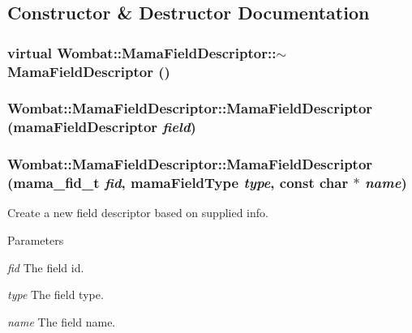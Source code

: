 \subsection{Constructor \& Destructor Documentation}
\hypertarget{classWombat_1_1MamaFieldDescriptor_a4cdfb03e5132217d4eda78ba12ab48e8}{
\subsubsection[{$\sim$MamaFieldDescriptor}]{\setlength{\rightskip}{0pt plus 5cm}virtual Wombat::MamaFieldDescriptor::$\sim$MamaFieldDescriptor ()}}
\label{classWombat_1_1MamaFieldDescriptor_a4cdfb03e5132217d4eda78ba12ab48e8}
\hypertarget{classWombat_1_1MamaFieldDescriptor_a3de9bbef1117efb9a923eb9e71381958}{
\subsubsection[{MamaFieldDescriptor}]{\setlength{\rightskip}{0pt plus 5cm}Wombat::MamaFieldDescriptor::MamaFieldDescriptor (mamaFieldDescriptor {\em field})}}
\label{classWombat_1_1MamaFieldDescriptor_a3de9bbef1117efb9a923eb9e71381958}
\hypertarget{classWombat_1_1MamaFieldDescriptor_a05360c572e90e2b40948888678659ab7}{
\subsubsection[{MamaFieldDescriptor}]{\setlength{\rightskip}{0pt plus 5cm}Wombat::MamaFieldDescriptor::MamaFieldDescriptor (mama\_\-fid\_\-t {\em fid}, \/  mamaFieldType {\em type}, \/  const char $\ast$ {\em name})}}
\label{classWombat_1_1MamaFieldDescriptor_a05360c572e90e2b40948888678659ab7}


Create a new field descriptor based on supplied info. 
\begin{DoxyParams}{Parameters}
\item[{\em fid}]The field id. \item[{\em type}]The field type. \item[{\em name}]The field name. \end{DoxyParams}


